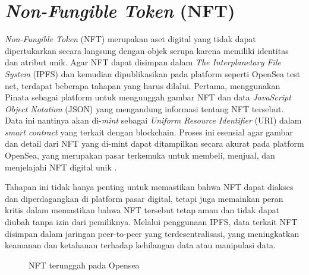 \section{\emph{Non-Fungible Token} (NFT)}
\emph{Non-Fungible Token} (NFT) merupakan aset digital yang tidak dapat dipertukarkan secara langsung dengan objek serupa karena memiliki identitas dan atribut unik. Agar NFT dapat disimpan dalam \emph{The Interplanetary File System} (IPFS) dan kemudian dipublikasikan pada platform seperti OpenSea test net, terdapat beberapa tahapan yang harus dilalui. Pertama, menggunakan Pinata sebagai platform untuk mengunggah gambar NFT dan data \emph{JavaScript Object Notation} (JSON) yang mengandung informasi tentang NFT tersebut. Data ini nantinya akan di-\emph{mint} sebagai \emph{Uniform Resource Identifier} (URI) dalam \emph{smart contract} yang terkait dengan blockchain. Proses ini esensial agar gambar dan detail dari NFT yang di-mint dapat ditampilkan secara akurat pada platform OpenSea, yang merupakan pasar terkemuka untuk membeli, menjual, dan menjelajahi NFT digital unik \cite{YourCitationHere}.

Tahapan ini tidak hanya penting untuk memastikan bahwa NFT dapat diakses dan diperdagangkan di platform pasar digital, tetapi juga memainkan peran kritis dalam memastikan bahwa NFT tersebut tetap aman dan tidak dapat diubah tanpa izin dari pemiliknya. Melalui penggunaan IPFS, data terkait NFT disimpan dalam jaringan peer-to-peer yang terdesentralisasi, yang meningkatkan keamanan dan ketahanan terhadap kehilangan data atau manipulasi data.
  
  \begin{figure} [H] \centering
    \caption{NFT terunggah pada Opensea}
    \label{fig:opensea}
  \end{figure}
  
